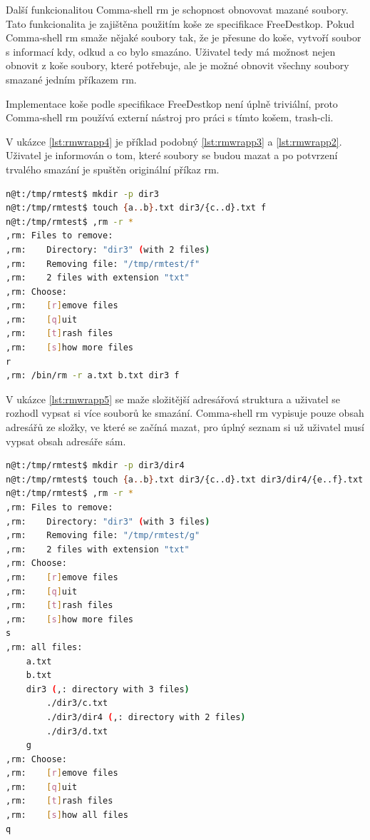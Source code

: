 \documentclass[thesis=M,czech]{FITthesis}[2012/06/26]
\begin{document}
Další funkcionalitou Comma-shell rm je schopnost obnovovat mazané soubory. Tato funkcionalita je zajištěna použitím koše ze specifikace FreeDestkop. Pokud Comma-shell rm smaže nějaké soubory tak, že je přesune do koše, vytvoří soubor s informací kdy, odkud a co bylo smazáno. Uživatel tedy má možnost nejen obnovit z koše soubory, které potřebuje, ale je možné obnovit všechny soubory smazané jedním příkazem rm.

Implementace koše podle specifikace FreeDestkop není úplně triviální, proto Comma-shell rm používá externí nástroj pro práci s tímto košem, trash-cli.


V ukázce \ref{lst:rmwrapp4} je příklad podobný \ref{lst:rmwrapp3} a \ref{lst:rmwrapp2}. Uživatel je informován o tom, které soubory se budou mazat a po potvrzení trvalého smazání je spuštěn originální příkaz rm.

\begin{minipage}{\linewidth}
\begin{lstlisting}[language=bash, caption={rm s }, label={lst:rmwrapp4}]
n@t:/tmp/rmtest$ mkdir -p dir3
n@t:/tmp/rmtest$ touch {a..b}.txt dir3/{c..d}.txt f
n@t:/tmp/rmtest$ ,rm -r *
,rm: Files to remove:
,rm:    Directory: "dir3" (with 2 files)
,rm:    Removing file: "/tmp/rmtest/f"
,rm:    2 files with extension "txt"
,rm: Choose:
,rm:    [r]emove files
,rm:    [q]uit
,rm:    [t]rash files
,rm:    [s]how more files
r
,rm: /bin/rm -r a.txt b.txt dir3 f
\end{lstlisting}
\end{minipage}


V ukázce \ref{lst:rmwrapp5} se maže složitější adresářová struktura a uživatel se rozhodl vypsat si více souborů ke smazání. Comma-shell rm vypisuje pouze obsah adresářů ze složky, ve které se začíná mazat, pro úplný seznam si už uživatel musí vypsat obsah adresáře sám.

\begin{minipage}{\linewidth}
\begin{lstlisting}[language=bash, caption={rm s }, label={lst:rmwrapp5}]
n@t:/tmp/rmtest$ mkdir -p dir3/dir4
n@t:/tmp/rmtest$ touch {a..b}.txt dir3/{c..d}.txt dir3/dir4/{e..f}.txt g
n@t:/tmp/rmtest$ ,rm -r *
,rm: Files to remove:
,rm:    Directory: "dir3" (with 3 files)
,rm:    Removing file: "/tmp/rmtest/g"
,rm:    2 files with extension "txt"
,rm: Choose:
,rm:    [r]emove files
,rm:    [q]uit
,rm:    [t]rash files
,rm:    [s]how more files
s
,rm: all files:
    a.txt
    b.txt
    dir3 (,: directory with 3 files)
        ./dir3/c.txt
        ./dir3/dir4 (,: directory with 2 files)
        ./dir3/d.txt
    g
,rm: Choose:
,rm:    [r]emove files
,rm:    [q]uit
,rm:    [t]rash files
,rm:    [s]how all files
q
\end{lstlisting}
\end{minipage}
\end{document}
